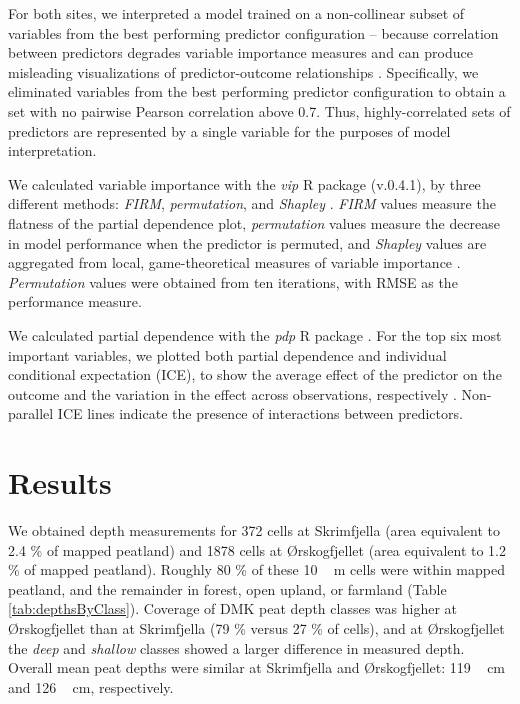 \documentclass[soil, manuscript]{copernicus}
\begin{document}
For both sites, we interpreted a model trained on a non-collinear subset of variables from the best performing predictor configuration -- because correlation between predictors degrades variable importance measures \citep{stroblConditionalVariableImportance2008, biauRandomForestGuided2016} and can produce misleading visualizations of predictor-outcome relationships \citep{biecekExplanatoryModelAnalysis2021, dwivediExplainableAIXAI2023}.
Specifically, we eliminated variables from the best performing predictor configuration to obtain a set with no pairwise Pearson correlation above 0.7.
Thus, highly-correlated sets of predictors are represented by a single variable for the purposes of model interpretation.

We calculated variable importance with the \emph{vip} R package (v.0.4.1), by three different methods: \emph{FIRM}, \emph{permutation}, and \emph{Shapley} \citep{greenwellVariableImportancePlots2020}.
\emph{FIRM} values measure the flatness of the partial dependence plot, \emph{permutation} values measure the decrease in model performance when the predictor is permuted, and \emph{Shapley} values are aggregated from local, game-theoretical measures of variable importance \citep{greenwellVariableImportancePlots2020}.
\emph{Permutation} values were obtained from ten iterations, with RMSE as the performance measure.

We calculated partial dependence with the \emph{pdp} R package \citep[v.0.8.1,][]{greenwellPdpPackageConstructing2017}.
For the top six most important variables, we plotted both partial dependence and individual conditional expectation (ICE), to show the average effect of the predictor on the outcome and the variation in the effect across observations, respectively \citep{goldsteinPeekingBlackBox2015}.
Non-parallel ICE lines indicate the presence of interactions between predictors.

\section{Results}

We obtained depth measurements for 372 cells at Skrimfjella (area equivalent to 2.4 \% of mapped peatland) and 1878 cells at Ørskogfjellet (area equivalent to 1.2 \% of mapped peatland).
Roughly 80 \% of these \unit{10\,m} cells were within mapped peatland, and the remainder in forest, open upland, or farmland (Table \ref{tab:depthsByClass}).
Coverage of DMK peat depth classes was higher at Ørskogfjellet than at Skrimfjella (79 \% versus 27 \% of cells), and at Ørskogfjellet the \emph{deep} and \emph{shallow} classes showed a larger difference in measured depth.
Overall mean peat depths were similar at Skrimfjella and Ørskogfjellet: \unit{119\,cm} and \unit{126\,cm}, respectively.
\end{document}
